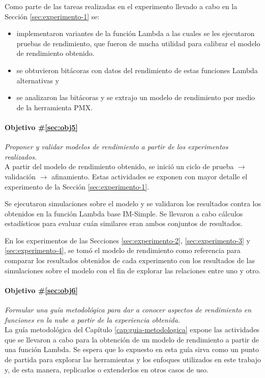 Como parte de las tareas realizadas en el experimento llevado a cabo en la Sección \ref{sec:experimento-1} se:
\begin{itemize}
    \item implementaron variantes de la función Lambda a las cuales se les ejecutaron pruebas de rendimiento, que fueron de mucha utilidad para calibrar el modelo de rendimiento obtenido.
    \item se obtuvieron bitácoras con datos del rendimiento de estas funciones Lambda alternativas y
    \item se analizaron las bitácoras y se extrajo un modelo de rendimiento por medio de la herramienta PMX.
\end{itemize}


\paragraph{Objetivo \#\ref{sec:obj5}} \emph{Proponer y validar modelos de rendimiento a partir de los experimentos realizados.}\\
A partir del modelo de rendimiento obtenido, se inició un ciclo de prueba $\rightarrow$ validación $\rightarrow$ afinamiento. Estas actividades se exponen con mayor detalle el experimento de la Sección \ref{sec:experimento-1}.

Se ejecutaron simulaciones sobre el modelo y se validaron los resultados contra los obtenidos en la función Lambda base IM-Simple. Se llevaron a cabo cálculos estadísticos para evaluar cuán similares eran ambos conjuntos de resultados.

En los experimentos de las Secciones \ref{sec:experimento-2}, \ref{sec:experimento-3} y \ref{sec:experimento-4}, se tomó el modelo de rendimiento como referencia para comparar los resultados obtenidos de cada experimento con los resultados de las simulaciones sobre el modelo con el fin de explorar las relaciones entre uno y otro.

\paragraph{Objetivo \#\ref{sec:obj6}} \emph{Formular una guía metodológica para dar a conocer aspectos de rendimiento en funciones en la nube a partir de la experiencia obtenida.}\\
La guía metodológica del Capítulo \ref{cap:guia-metodologica} expone las actividades que se llevaron a cabo para la obtención de un modelo de rendimiento a partir de una función Lambda. Se espera que lo expuesto en esta guía sirva como un punto de partida para explorar las herramientas y los enfoques utilizados en este trabajo y, de esta manera, replicarlos o extenderlos en otros casos de uso.

